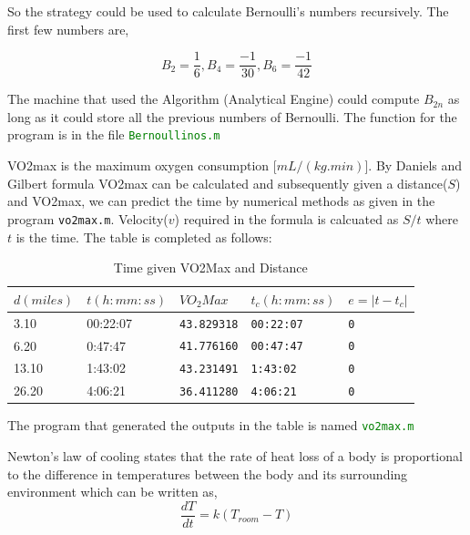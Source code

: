 \documentclass[fleqn,letterpaper,12pt]{report}
\begin{document}
So the strategy could be used to calculate Bernoulli's numbers recursively. The first few numbers are,

$$ B_2 = \frac{1}{6}, B_4 = \frac{-1}{30}, B_6 = \frac{-1}{42}$$

The machine that used the Algorithm (Analytical Engine) could compute $B_{2n}$ as long as it could store all the previous numbers of Bernoulli.\cite{lll} The function for the program is in the file \textcolor{Green}{\tt Bernoullinos.m}\cite{PK}
%
\newpage
{}
{}
\problem
VO2max is the maximum oxygen consumption [$mL/(kg.min)$]. By Daniels and Gilbert formula VO2max can be calculated and subsequently given a distance($S$) and VO2max, we can predict the time by numerical methods as given in the program {\tt vo2max.m}. Velocity{($v$)} required in the formula is calcuated as {$S/t$} where {$ t $} is the time. The table is completed as follows:
\begin{table}[h]
\centering
\caption{Time given VO2Max and Distance}
\label{my-label}
\begin{tabular}{|l|l|l|l|l|}
\hline
$d(miles)$ & $t(h:mm:ss)$ & $VO_2Max$  & $t_c(h:mm:ss)$ & $e = |t - t_c|$ \\ \hline \hline
3.10       & 00:22:07    & {\tt43.829318} & {\tt00:22:07}      & {\tt0}               \\ \hline
6.20       & 0:47:47     & {\tt41.776160} & {\tt00:47:47}      & {\tt0}               \\ \hline
13.10      & 1:43:02     & {\tt43.231491} & {\tt1:43:02}       & {\tt0}               \\ \hline
26.20      & 4:06:21     & {\tt36.411280} & {\tt4:06:21}       & {\tt0}               \\ \hline
\end{tabular}%
\end{table}

The program that generated the outputs in the table is named \textcolor{Green}{\tt vo2max.m}
%
\newpage
{}
{}
\problem
Newton's law of cooling states that the rate of heat loss of a body is proportional to the difference in temperatures between the body and its surrounding environment which can be written as,
\begin{equation}
\frac{dT}{dt} = k(T_{room} -T)
\end{equation}
\end{document}
